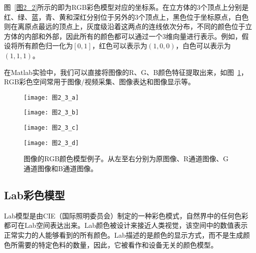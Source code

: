 图~\ref{图2_2}所示的即为RGB彩色模型对应的坐标系\cite{ZhangZheng2010book}。在立方体的3个顶点上分别是红、绿、蓝，青、黄和深红分别位于另外的3个顶点上，黑色位于坐标原点，白色则在离原点最远的顶点上，灰度级沿着这两点的连线依次分布，不同的颜色位于立方体的内部和外部，因此所有的颜色都可以通过一个3维向量进行表示。例如，假设将所有颜色归一化为$[0,1]$，红色可以表示为$(1,0,0)$，白色可以表示为$(1,1,1)$。

在Matlab实验中，我们可以直接将图像的R、G、B颜色特征提取出来，如图~\ref{图2_3}，RGB彩色空间常用于图像/视频采集、图像表达和图像显示等。

\begin{figure}[b]
\begin{minipage}{0.24\textwidth}
  \centering
  \texttt{[image: 图2\_3\_a]}
  \label{图2_3_a}
\end{minipage}\hfill
\begin{minipage}{0.24\textwidth}
  \centering
  \texttt{[image: 图2\_3\_b]}
  \label{图2_3_b}
\end{minipage}
\begin{minipage}{0.24\textwidth}
  \centering
  \texttt{[image: 图2\_3\_c]}
  \label{图2_3_c}
\end{minipage}
\begin{minipage}{0.24\textwidth}
  \centering
  \texttt{[image: 图2\_3\_d]}
  \label{图2_3_d}
\end{minipage}
  \caption{图像的RGB颜色模型例子。从左至右分别为原图像、R通道图像、G通道图像和B通道图像。}
  \label{图2_3} 
\end{figure}

\subsection{Lab彩色模型}
\label{2_1_2}

Lab模型是由CIE（国际照明委员会）制定的一种彩色模式，自然界中的任何色彩都可在Lab空间表达出来\cite{ZhangZheng2010book}。Lab颜色被设计来接近人类视觉，该空间中的数值表示正常实力的人能够看到的所有颜色。Lab描述的是颜色的显示方式，而不是生成颜色所需要的特定色料的数量，因此，它被看作和设备无关的颜色模型。

